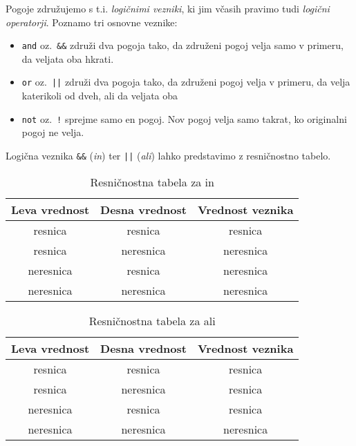 \documentclass{article}
\begin{document}
Pogoje združujemo s t.i. \emph{logičnimi vezniki}, ki jim včasih pravimo tudi
\emph{logični operatorji}. Poznamo tri osnovne veznike:
\begin{itemize}
  \item \verb+and+ oz.~\verb+&&+ združi dva pogoja tako, da združeni pogoj velja
	samo v primeru, da veljata oba hkrati.
  \item \verb+or+ oz.~\verb+||+ združi dva pogoja tako, da združeni pogoj velja
	v primeru, da velja katerikoli od dveh, ali da veljata oba
  \item \verb+not+ oz.~\verb+!+ sprejme samo en pogoj. Nov pogoj velja samo
	takrat, ko originalni pogoj ne velja.
\end{itemize}

Logična veznika \verb+&&+ (\emph{in}) ter \verb+||+ (\emph{ali}) lahko
predstavimo z resničnostno tabelo.

\begin{table}[h!]
  \centering
  \caption{Resničnostna tabela za in}
  \vspace{0.1cm}
  \begin{tabular}{c|c|c}
	Leva vrednost & Desna vrednost & Vrednost veznika \\
	\hline
	resnica & resnica & resnica \\
	resnica & neresnica & neresnica \\
	neresnica & resnica & neresnica \\
	neresnica & neresnica & neresnica
  \end{tabular}
\end{table}

\begin{table}[h!]
  \centering
  \caption{Resničnostna tabela za ali}
  \vspace{0.1cm}
  \begin{tabular}{c|c|c}
	Leva vrednost & Desna vrednost & Vrednost veznika \\
	\hline
	resnica & resnica & resnica \\
	resnica & neresnica & resnica \\
	neresnica & resnica & resnica \\
	neresnica & neresnica & neresnica
  \end{tabular}
\end{table}
\end{document}
